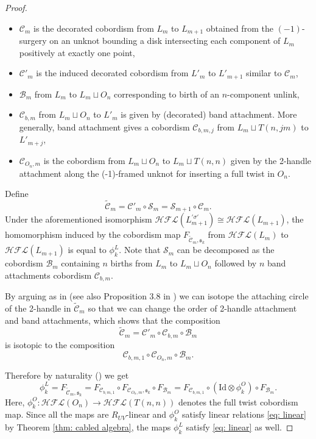 \documentclass{amsart}
\newcommand{\cHFL}{\mathcal{H\!F\! L}}
\newcommand{\s}{\mathfrak{s}}
\newcommand{\Id}{\mathrm{Id}}
\begin{document}
\begin{proof}
\begin{itemize}
\item $\mathcal{C}_{m}$ is the decorated cobordism from $L_m$ to $L_{m+1}$ obtained from the $(-1)$-surgery on an unknot bounding a disk intersecting each component of $L_m$ positively at exactly one point,
\item $\mathcal{C}'_m$ is the induced decorated cobordism from $L'_{m}$ to $L'_{m+1}$ similar to $\mathcal{C}_m$,
\item $\mathcal{B}_m$ from $L_{m}$ to $L_{m}\sqcup O_n$ corresponding to birth of an $n$-component unlink,
\item $\mathcal{C}_{b,m}$ from $L_{m}\sqcup O_n$ to $L'_{m}$ is given by (decorated) band attachment. More generally, band attachment gives a cobordism
$\mathcal{C}_{b,m,j}$ from $L_{m}\sqcup T(n,jm)$ to $L'_{m+j}$,
\item $\mathcal{C}_{O_n,m}$  is the cobordism from $L_{m}\sqcup O_n$ to $L_{m}\sqcup T(n,n)$ given by the 2-handle attachment along the (-1)-framed unknot for inserting a full twist in $O_n$.
\end{itemize}

Define
$$\tilde{\mathcal{C}}_m=\mathcal{C}'_m\circ \mathcal{S}_m=\mathcal{S}_{m+1} \circ \mathcal{C}_m.$$
Under the aforementioned isomorphism $\cHFL(L_{m+1}^{'\sigma'})\cong \cHFL(L_{m+1})$, the homomorphism induced by the cobordism map $F_{\tilde{\mathcal{C}}_m, \s_k}$
 from $\cHFL(L_{m})$ to $\cHFL(L_{m+1})$ is equal to $\phi^{L}_k$. Note that $\mathcal{S}_m$ can be decomposed as the cobordism $\mathcal{B}_m$ containing $n$ births from $L_{m}$ to $L_{ m}\sqcup O_n$ followed by $n$ band attachments cobordism $\mathcal{C}_{b,m}$. 

By arguing as in \cite[Proposition 3.13]{AGL} (see also Proposition 3.8 in \cite{AGL}) we can isotope the attaching circle of the 2-handle in $\tilde{\mathcal{C}}_m$ so that we can
change the order of 2-handle attachment and band attachments, which shows that the composition
$$
\tilde{\mathcal{C}}_m=\mathcal{C}'_{m}\circ \mathcal{C}_{b,m}\circ \mathcal{B}_{m}
$$
is isotopic to the composition
$$
\mathcal{C}_{b,m,1}\circ \mathcal{C}_{O_n,m}\circ \mathcal{B}_{m}.
$$

Therefore by naturality (\cite{Zemke}) we get
$$
\phi_k^{L}=F_{\tilde{\mathcal{C}}_m, \s_k}=F_{\mathcal{C}_{b,m,1}}\circ F_{\mathcal{C}_{O_n,m},\mathfrak{s}_k}\circ F_{\mathcal{B}_{m}}=F_{\mathcal{C}_{b,m,1}}\circ \left(\Id\otimes \phi_k^{O}\right)\circ F_{\mathcal{B}_{m}}.
$$
Here, $\phi_k^{O}: \cHFL(O_{n})\rightarrow \cHFL(T(n,n))$ denotes the full twist cobordism map. Since all the maps are $R_{UV}$-linear and  $\phi_k^{O}$ satisfy linear relations \eqref{eq: linear} by Theorem \ref{thm: cabled algebra}, the maps $\phi_k^{L}$ satisfy \eqref{eq: linear} as well. 


\end{proof}
\end{document}
